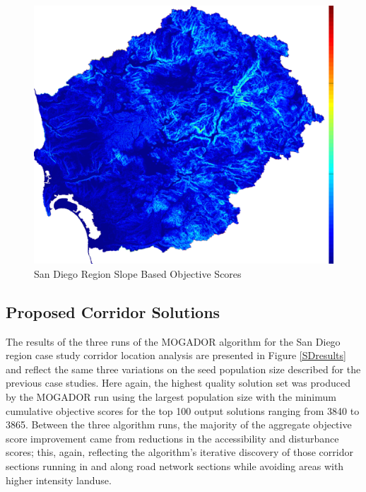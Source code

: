         \begin{figure}[!h]
            \begin{center}
            \includegraphics[width=5.5in]{figures/SanDiego_SlopeScore.png}   
            \caption{San Diego Region Slope Based Objective Scores}
            \label{fig:SDslope}
            \end{center}
        \end{figure}
        
    \subsection{Proposed Corridor Solutions}

The results of the three runs of the MOGADOR algorithm for the San Diego region case study corridor location analysis are presented in Figure \ref{SDresults} and reflect the same three variations on the seed population size described for the previous case studies. Here again, the highest quality solution set was produced by the MOGADOR run using the largest population size with the minimum cumulative objective scores for the top 100 output solutions ranging from 3840 to 3865. Between the three algorithm runs, the majority of the aggregate objective score improvement came from reductions in the accessibility and disturbance scores; this, again, reflecting the algorithm's iterative discovery of those corridor sections running in and along road network sections while avoiding areas with higher intensity landuse.

